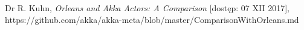 \begin{thebibliography}{20}%

Dr R. Kuhn, \emph{Orleans and Akka Actors: A Comparison} [dostęp: 07 XII 2017], https://github.com/akka/akka-meta/blob/master/ComparisonWithOrleans.md


\end{thebibliography}